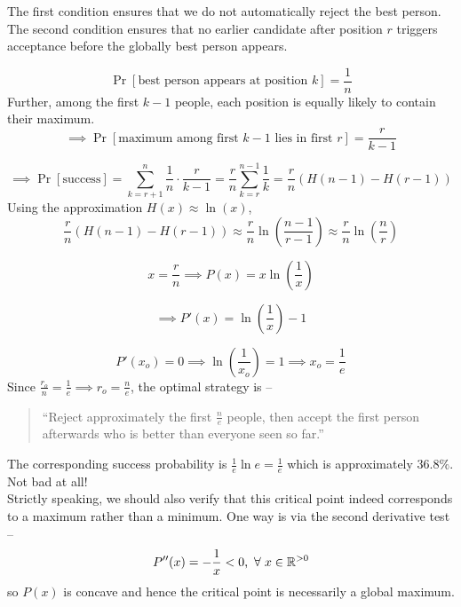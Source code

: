 \documentclass[11pt,openany]{book}
\begin{document}
\noindent The first condition ensures that we do not automatically reject the best person.
The second condition ensures that no earlier candidate after position \(r\) triggers acceptance before the globally best person appears.

\vspace{0.4em}
\[
\Pr[\text{best person appears at position }k] = \frac{1}{n}
\]
\vspace{0.2em}
Further, among the first \(k-1\) people, each position is equally likely to contain their maximum. 
\vspace{0.2em}
\[
\implies
\Pr[\text{maximum among first }k-1\text{ lies in first }r]
=
\frac{r}{k-1}
\]

\[
\implies
\Pr[\text{success}]
=
\sum_{k=r+1}^{n}
\frac{1}{n}\cdot\frac{r}{k-1}
=
\frac{r}{n}
\sum_{k=r}^{n-1}\frac{1}{k}
=
\frac{r}{n} \left(H(n-1)-H(r-1)\right)
\]
\vspace{0.2em}
\noindent Using the approximation $H(x) \approx \ln(x)$,
\[
\frac{r}{n} \left(H(n-1)-H(r-1)\right)
\approx
\frac{r}{n} \ln\left(\frac{n-1}{r-1}\right) 
\approx
\frac{r}{n} \ln\left(\frac{n}{r}\right)
\]

\[
x=\frac{r}{n} 
\implies
P(x)=x\ln\left(\frac{1}{x}\right)
\]

\[
\implies
P'(x)=\ln\left(\frac{1}{x}\right)-1
\]

\[
P'(x_o)=0
\implies
\ln\left(\frac{1}{x_o}\right)=1
\implies
x_o=\frac{1}{e}
\]
\vspace{0.4em}
\noindent Since $\frac{r_o}{n}=\frac{1}{e} \implies r_o=\frac{n}{e}$, the optimal strategy is --
\begin{quote}
``Reject approximately the first \(\frac{n}{e}\) people, then accept the first person 
afterwards who is better than everyone seen so far.''
\end{quote}

\noindent The corresponding success probability is $\frac{1}{e}\ln e = \frac{1}{e}$ which is 
approximately \(\mathbf{36.8\%}\). Not bad at all!\\


\noindent Strictly speaking, we should also verify that this critical point indeed corresponds to a 
maximum rather than a minimum. One way is via the second derivative test --
\[
P''(x)=-\frac{1}{x}<0\text{,} \hspace{0.5em} \forall \hspace{0.3em} x \in \mathbb R^{>0}
\]
so \(P(x)\) is concave and hence the critical point is necessarily a global maximum.\\
\end{document}
